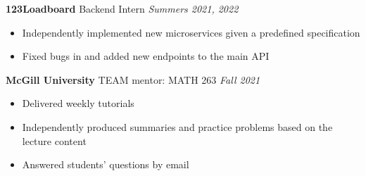 \documentclass[12pt]{article}
\newenvironment{gitemize}{\begin{itemize} \color{mygrey}}{\end{itemize}}
\begin{document}
\textbf{123Loadboard} Backend Intern
\hfill
\textit{Summers 2021, 2022}
\begin{gitemize}
	\item Independently implemented new microservices given a predefined specification
	\item Fixed bugs in and added new endpoints to the main API
\end{gitemize}


\textbf{McGill University} TEAM mentor: MATH 263
\hfill
\textit{Fall 2021}
\begin{gitemize}
    \item Delivered weekly tutorials
    \item Independently produced summaries and practice problems based on the lecture content
    \item Answered students' questions by email
\end{gitemize}
\end{document}
